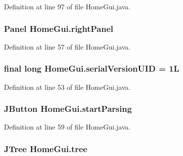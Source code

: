 Definition at line 97 of file Home\-Gui.\-java.

\hypertarget{class_home_gui_adb0131b6ea64353bf6b0c5993468341c}{
\subsubsection[{right\-Panel}]{\setlength{\rightskip}{0pt plus 5cm}Panel {\bf Home\-Gui.\-right\-Panel}}}\label{class_home_gui_adb0131b6ea64353bf6b0c5993468341c}


Definition at line 57 of file Home\-Gui.\-java.

\hypertarget{class_home_gui_a6a93dac6b8c89a59ca14536d6f5ad414}{
\subsubsection[{serial\-Version\-U\-I\-D}]{\setlength{\rightskip}{0pt plus 5cm}final long {\bf Home\-Gui.\-serial\-Version\-U\-I\-D} = 1\-L}}\label{class_home_gui_a6a93dac6b8c89a59ca14536d6f5ad414}


Definition at line 53 of file Home\-Gui.\-java.

\hypertarget{class_home_gui_aedb975e31137435a02772599392bf195}{
\subsubsection[{start\-Parsing}]{\setlength{\rightskip}{0pt plus 5cm}J\-Button {\bf Home\-Gui.\-start\-Parsing}}}\label{class_home_gui_aedb975e31137435a02772599392bf195}


Definition at line 59 of file Home\-Gui.\-java.

\hypertarget{class_home_gui_ab4af4f54e925eedcab3cb87da41410e1}{
\subsubsection[{tree}]{\setlength{\rightskip}{0pt plus 5cm}J\-Tree {\bf Home\-Gui.\-tree}}}\label{class_home_gui_ab4af4f54e925eedcab3cb87da41410e1}


